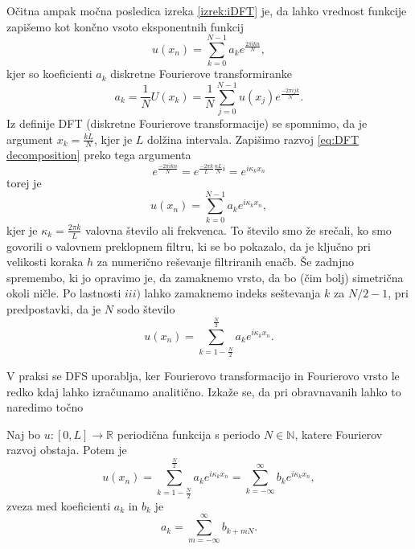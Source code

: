 \documentclass[mat2, tisk]{fmfdelo}
\newcommand{\R}{\mathbb R}
\newcommand{\N}{\mathbb N}
\begin{document}
Očitna ampak močna posledica izreka \ref{izrek:iDFT} je, da lahko 
vrednost funkcije zapišemo kot končno vsoto eksponentnih funkcij 
\begin{equation}
  \label{eq:DFT decomposition}
u(x_n) = \sum_{k=0}^{N-1} a_k e^{\frac{2\pi i k n}{N}},
\end{equation}
kjer so koeficienti $a_k$ diskretne Fourierove transformiranke 
\begin{equation}
a_k = \frac{1}{N} U(x_k) = \frac{1}{N} \sum_{j=0}^{N-1} u(x_j) e^{\frac{-2\pi i j k}{N}}.
\end{equation}
Iz definije DFT (diskretne Fourierove transformacije) se spomnimo, da je 
argument $x_k = \frac{k L}{N}$, kjer je $L$ dolžina intervala. Zapišimo 
razvoj \ref{eq:DFT decomposition} preko tega argumenta 
$$
e^{\frac{-2\pi i k n}{N}} = e^{\frac{-2\pi k}{L}\frac{nL}{N}i} = e^{i\kappa_k x_n}
$$
torej je 
\begin{equation}
u(x_n) = \sum_{k=0}^{N-1} a_k e^{i\kappa_k x_n},
\end{equation}
kjer je $\kappa_k = \frac{2\pi k}{L}$ valovna število ali frekvenca.
To število smo že srečali, ko smo govorili o valovnem preklopnem 
filtru, ki se bo pokazalo, da je ključno pri velikosti koraka $h$ 
za numerično reševanje filtriranih enačb. Še zadnjno spremembo, ki 
jo opravimo je, da zamaknemo vrsto, da bo (čim bolj) simetrična okoli ničle. 
Po lastnosti $iii)$ lahko zamaknemo indeks seštevanja $k$ za $N/2 - 1$, pri 
predpostavki, da je $N$ sodo število
\begin{equation}
  \label{eq:DFS expantion}
u(x_n) = \sum_{k=1-\frac{N}{2}}^{\frac{N}{2}} a_k e^{i\kappa_k x_n}.
\end{equation} 

V praksi se DFS uporablja, ker Fourierovo transformacijo in 
Fourierovo vrsto le redko kdaj lahko izračunamo analitično.
Izkaže se, da pri obravnavanih lahko to naredimo točno 
\begin{izrek}
Naj bo $u: [0, L] \rightarrow \R$ periodična funkcija s periodo $N\in \N$, katere Fourierov 
razvoj obstaja. Potem je 
\begin{equation}
u(x_n) = \sum_{k=1-\frac{N}{2}}^{\frac{N}{2}} a_k e^{i\kappa_k x_n} =
\sum_{k=-\infty}^{\infty} b_k e^{i\kappa_k x_n},
\end{equation}
zveza med koeficienti $a_k$ in $b_k$ je
\begin{equation}
  a_k = \sum_{m=-\infty}^{\infty} b_{k + mN}. 
\end{equation}
\end{izrek}
\end{document}
